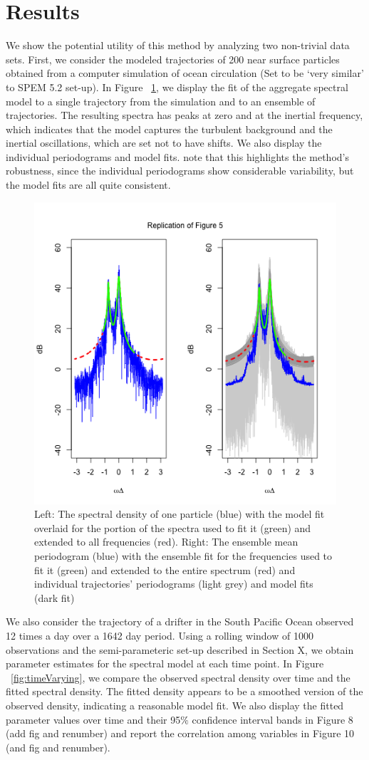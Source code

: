 \documentclass{stat572Style}
\begin{document}
\section{Results}
We show the potential utility of this method by analyzing two non-trivial data sets.  
First, we consider the modeled trajectories of 200 near surface particles obtained from a computer simulation of ocean circulation (Set to be `very similar' to \citet{Danioux2008} SPEM 5.2 set-up). 
In Figure ~\ref{fig:numSim}, we display the fit of the aggregate spectral model to a single trajectory from the simulation and to an ensemble of trajectories. 
The resulting spectra has peaks at zero and at the inertial frequency, which indicates that the model captures the turbulent background and the inertial oscillations, which are set not to have shifts. 
We also display the individual periodograms and model fits. 
\citet{Sykulski2016}  note that this highlights the method's robustness, since the individual periodograms show considerable variability, but the model fits are all quite consistent.
\begin{figure}[hb]
	\label{fig:numSim}
  \centering
    \includegraphics[width=.5\textwidth]{fig5.png}
        \caption{Left: The spectral density of one particle (blue) with the model fit overlaid for the portion of the spectra used to fit it (green) and extended to all frequencies (red). Right: The ensemble mean periodogram (blue) with the ensemble fit for the frequencies used to fit it (green) and extended to the entire spectrum (red) and individual trajectories' periodograms (light grey) and model fits (dark fit) }
\end{figure}

We also consider the trajectory of a drifter in the South Pacific Ocean observed 12 times a day over a 1642 day period. 
Using a rolling window of 1000 observations and the semi-parameteric set-up described in Section X, we obtain parameter estimates for the spectral model at each time point.
 In Figure ~\ref{fig:timeVarying}, we compare the observed spectral density over time and the fitted spectral density.
  The fitted density appears to be a smoothed version of the observed density, indicating a reasonable model fit.
   We also display the fitted parameter values over time and their 95$\%$ confidence interval bands in Figure 8 (add fig and renumber) and report the correlation among variables in Figure 10 (and fig and renumber). 
\end{document}
